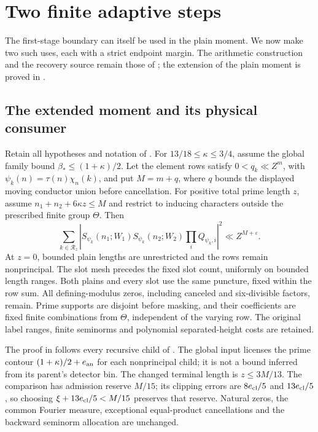 \section{Two finite adaptive steps}\label{gex:adaptive-section}

The first-stage boundary can itself be used in the plain moment.
We now make two such uses, each with a strict endpoint margin.
The arithmetic construction and the recovery source remain those of
\cite{OAI26}; the extension of the plain moment is proved in
\cite[Theorem 1.1]{GaoAdaptive26}.

\subsection{The extended moment and its physical consumer}

\begin{lemma}\label{gex:adaptive-plain}
Retain all hypotheses and notation of \cite[Lemma 18.1]{OAI26}.
For \(13/18\le\kappa\le3/4\), assume the global family bound
\(\beta_*\le(1+\kappa)/2\). Let the element rows satisfy
\(0<q_k\ll Z^m\), with \(\psi_k(n)=\tau(n)\chi_n(k)\), and put
\(M=m+q\), where \(q\) bounds the displayed moving conductor union
before cancellation. For positive total prime length \(z\), assume
\(n_1+n_2+6\kappa z\le M\) and restrict to inducing characters
outside the prescribed finite group \(\Theta\). Then
\[
 \sum_{k\in\mathcal R_z}
 \left|S_{\psi_k}(n_1;W_1)S_{\psi_k}(n_2;W_2)
                  \prod_i Q_{\psi_k,i}\right|^2
 \ll Z^{M+\varepsilon}.
\]
At \(z=0\), bounded plain lengths are unrestricted and the rows remain
nonprincipal. The slot mesh precedes the fixed slot count, uniformly
on bounded length ranges. Both plains and every slot use the same
puncture, fixed within the row sum. All defining-modulus zeros,
including canceled and six-divisible factors, remain. Prime supports
are disjoint before masking, and their coefficients are fixed finite
combinations from \(\Theta\), independent of the varying row.
The original label ranges, finite seminorms and polynomial separated-height
costs are retained.
\end{lemma}

The proof in \cite{GaoAdaptive26} follows every recursive child of
\cite[Section 18]{OAI26}. The global input licenses the prime contour
\((1+\kappa)/2+e_{\rm an}\) for each nonprincipal child; it is not a
bound inferred from its parent's detector bin. The changed terminal
length is \(z\le3M/13\). The comparison has admission reserve
\(M/15\); its clipping errors are \(8e_{\rm cl}/5\) and
\(13e_{\rm cl}/5\), so choosing
\(\xi+13e_{\rm cl}/5<M/15\) preserves that reserve. Natural zeros,
the common Fourier measure, exceptional equal-product cancellations
and the backward seminorm allocation are unchanged.

